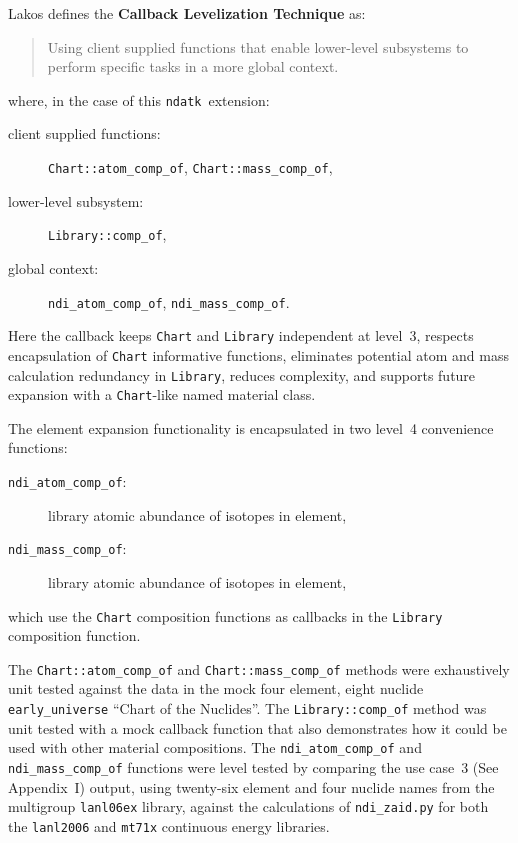 \documentclass[12pt]{lamemo}
\newcommand{\ndatk}{\texttt{ndatk}}
\begin{document}
Lakos defines the \textbf{Callback Levelization Technique} as:
\begin{quote}
  Using client supplied functions that enable lower-level subsystems
  to perform specific tasks in a more global context.\cite{lakos96}
\end{quote}
where, in the case of this \ndatk\ extension:
\begin{description}
\item[client supplied functions: ] \texttt{Chart::atom\_comp\_of}, 
  \texttt{Chart::mass\_comp\_of},
\item[lower-level subsystem: ] \texttt{Library::comp\_of},
\item[global context: ] \texttt{ndi\_atom\_comp\_of}, 
  \texttt{ndi\_mass\_comp\_of}. 
\end{description}
Here the callback keeps \texttt{Chart} and \texttt{Library} independent
at level~3, respects encapsulation of \texttt{Chart} informative
functions, eliminates potential atom and mass calculation redundancy in
\texttt{Library}, reduces complexity, and supports future expansion
with a \texttt{Chart}-like named material class.

The element expansion functionality is encapsulated in two level~4
convenience functions:
\begin{description}
\item[\texttt{ndi\_atom\_comp\_of}: ] library atomic abundance of
  isotopes in element,
\item[\texttt{ndi\_mass\_comp\_of}: ] library atomic abundance of
  isotopes in element,
\end{description}
which use the \texttt{Chart} composition functions as callbacks in the
\texttt{Library} composition function.

The \texttt{Chart::atom\_comp\_of} and \texttt{Chart::mass\_comp\_of}
methods were exhaustively unit tested against the data in the mock
four element, eight nuclide \texttt{early\_universe} ``Chart of the
Nuclides''.  The \texttt{Library::comp\_of} method was unit tested
with a mock callback function that also demonstrates how it could be
used with other material compositions.  The
\texttt{ndi\_atom\_comp\_of} and \texttt{ndi\_mass\_comp\_of}
functions were level tested by comparing the use case~3 (See Appendix~I)
output, using twenty-six element and four nuclide names from the
multigroup \texttt{lanl06ex} library, against the calculations of
\texttt{ndi\_zaid.py} for both the \texttt{lanl2006} and
\texttt{mt71x} continuous energy libraries.
  
\end{document}
